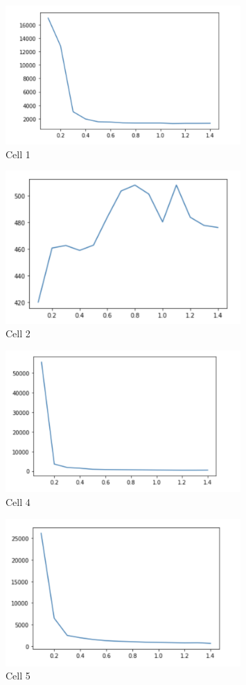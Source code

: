 \documentclass{report}
\begin{document}
\begin{figure}[ht]
  \centering
  \includegraphics[width=0.8\textwidth]{waite0.5_1_1}
  \caption{Cell 1}
\end{figure}

\begin{figure}[ht]
  \centering
  \includegraphics[width=0.8\textwidth]{waite0.5_2_1}
  \caption{Cell 2}
\end{figure}

\begin{figure}[ht]
  \centering
  \includegraphics[width=0.8\textwidth]{waite0.5_4_1}
  \caption{Cell 4}
\end{figure}

\begin{figure}[ht]
  \centering
  \includegraphics[width=0.8\textwidth]{waite0.5_5_1}
  \caption{Cell 5}
\end{figure}
  
\end{document}
